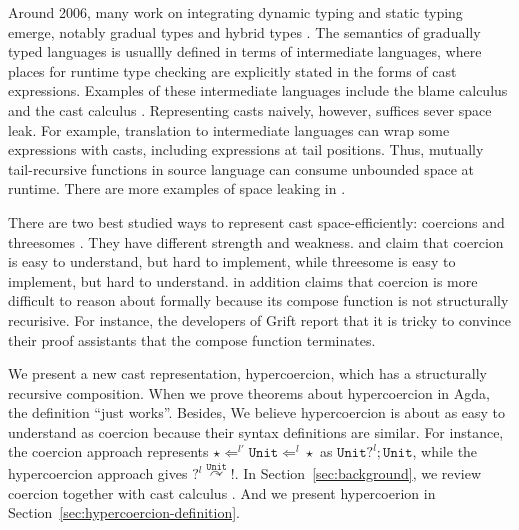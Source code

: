 \documentclass[acmsmall,review,anonymous]{acmart}\settopmatter{printfolios=true,printccs=false,printacmref=false}
\newcommand{\TOOdyn}[0]{\star}
\newcommand{\POOunit}[0]{\mathtt{Unit}}
\newcommand{\cOOcast}[3]{#3 \Leftarrow^{#2} #1}
\newcommand{\hyperCoercionC}[3]{#1 \overset{#2}{\curvearrowright} #3}
\begin{document}
Around 2006, many work on integrating dynamic typing and static typing emerge, 
notably gradual types \citep{siek2006gradual} and hybrid types 
\citep{flanagan2006hybrid}. The semantics of gradually typed languages is 
usuallly defined in terms of intermediate languages, where places for runtime 
type checking are explicitly stated in the forms of cast expressions. Examples 
of these intermediate languages include the blame calculus 
\citep{wadler2009well} 
and the cast calculus \citep{siek2009exploring}.
Representing casts naively, however, suffices sever space leak. 
For example, translation to intermediate languages can wrap some expressions 
with casts, including expressions at tail positions. Thus, mutually 
tail-recursive functions in source language can consume unbounded space at 
runtime. There are more examples of space leaking in \citet{herman2010space}.

There are two best studied ways to represent cast space-efficiently: coercions 
\citep{herman2010space}\citep{siek2009exploring}\citep{siek2012interpretations} 
\citep{siek2015blame} and threesomes 
\citep{siek2010threesomes}\citep{garcia2013calculating}. They have different 
strength and 
weakness. \citet{garcia2013calculating} and \citet{siek2015blame} claim that 
coercion is easy to understand, but hard to implement, while threesome is easy 
to implement, but hard to understand. \citet{garcia2013calculating} in addition 
claims that coercion is more difficult to reason about formally because 
its compose function is not structurally recurisive. For instance, the 
developers of Grift \citep{kuhlenschmidt2018efficient} report that it is tricky 
to convince their proof assistants that the compose function terminates.

We present a new cast representation, hypercoercion, which has a structurally 
recursive composition. When we prove theorems about hypercoercion in Agda, the 
definition ``just works''. 
Besides, We believe hypercoercion is about as easy to understand as coercion 
because their syntax definitions are similar. For instance, the 
coercion approach represents $ 
\cOOcast{\TOOdyn}{l}{\cOOcast{\POOunit}{l'}{\TOOdyn}} $ as $ \POOunit 
?^{l} ; \POOunit\! $, while the hypercoercion approach gives $ 
\hyperCoercionC{?^l}{\POOunit}{!} $. In Section~\ref{sec:background}, we review 
coercion together with cast calculus 
\citep{siek2009exploring}\citep{kuhlenschmidt2018efficient}. And we 
present hypercoerion in Section~\ref{sec:hypercoercion-definition}.
\end{document}
